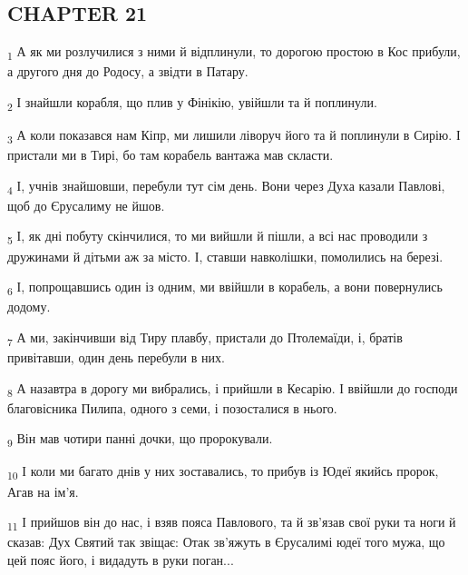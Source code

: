 \subsection{CHAPTER 21}
\begin{tcolorbox}
\textsubscript{1} А як ми розлучилися з ними й відплинули, то дорогою простою в Кос прибули, а другого дня до Родосу, а звідти в Патару.
\end{tcolorbox}
\begin{tcolorbox}
\textsubscript{2} І знайшли корабля, що плив у Фінікію, увійшли та й поплинули.
\end{tcolorbox}
\begin{tcolorbox}
\textsubscript{3} А коли показався нам Кіпр, ми лишили ліворуч його та й поплинули в Сирію. І пристали ми в Тирі, бо там корабель вантажа мав скласти.
\end{tcolorbox}
\begin{tcolorbox}
\textsubscript{4} І, учнів знайшовши, перебули тут сім день. Вони через Духа казали Павлові, щоб до Єрусалиму не йшов.
\end{tcolorbox}
\begin{tcolorbox}
\textsubscript{5} І, як дні побуту скінчилися, то ми вийшли й пішли, а всі нас проводили з дружинами й дітьми аж за місто. І, ставши навколішки, помолились на березі.
\end{tcolorbox}
\begin{tcolorbox}
\textsubscript{6} І, попрощавшись один із одним, ми ввійшли в корабель, а вони повернулись додому.
\end{tcolorbox}
\begin{tcolorbox}
\textsubscript{7} А ми, закінчивши від Тиру плавбу, пристали до Птолемаїди, і, братів привітавши, один день перебули в них.
\end{tcolorbox}
\begin{tcolorbox}
\textsubscript{8} А назавтра в дорогу ми вибрались, і прийшли в Кесарію. І ввійшли до господи благовісника Пилипа, одного з семи, і позосталися в нього.
\end{tcolorbox}
\begin{tcolorbox}
\textsubscript{9} Він мав чотири панні дочки, що пророкували.
\end{tcolorbox}
\begin{tcolorbox}
\textsubscript{10} І коли ми багато днів у них зоставались, то прибув із Юдеї якийсь пророк, Агав на ім'я.
\end{tcolorbox}
\begin{tcolorbox}
\textsubscript{11} І прийшов він до нас, і взяв пояса Павлового, та й зв'язав свої руки та ноги й сказав: Дух Святий так звіщає: Отак зв'яжуть в Єрусалимі юдеї того мужа, що цей пояс його, і видадуть в руки поган...
\end{tcolorbox}
